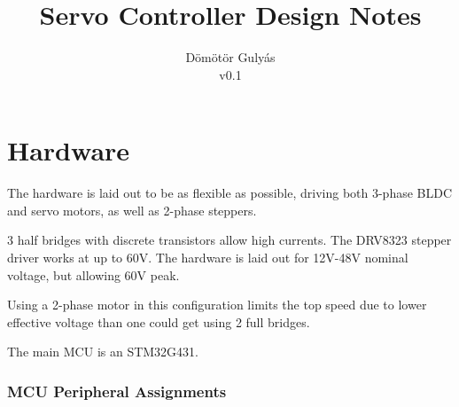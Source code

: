 \documentclass[12pt,a4paper,oneside,openany]{article}
\begin{document}
\title{Servo Controller Design Notes}
\author{Dömötör Gulyás\\v0.1}

\maketitle

%
%
%

\tableofcontents




\section{Hardware}

The hardware is laid out to be as flexible as possible, driving both 3-phase BLDC and servo motors, as well as 2-phase steppers.

3 half bridges with discrete transistors allow high currents. The DRV8323 stepper driver works at up to 60V. The hardware is laid out for 12V-48V nominal voltage, but allowing 60V peak.

Using a 2-phase motor in this configuration limits the top speed due to lower effective voltage than one could get using 2 full bridges.

The main MCU is an STM32G431.

\subsubsection{MCU Peripheral Assignments}
\end{document}
